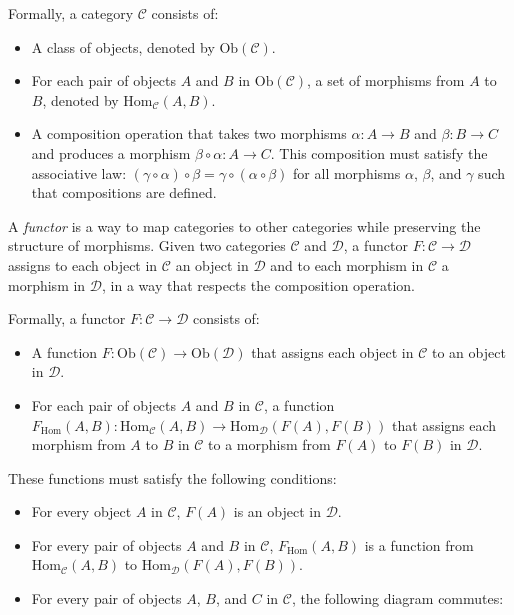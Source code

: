 \documentclass[11pt, a4paper, twoside, openany]{book}
\begin{document}
{\par\medskip
Formally, a category $\mathcal{C}$ consists of:
\begin{itemize}
\item A class of objects, denoted by $\text{Ob}(\mathcal{C})$.
\item For each pair of objects $A$ and $B$ in $\text{Ob}(\mathcal{C})$, a set of morphisms from $A$ to $B$, denoted by $\text{Hom}_{\mathcal{C}}(A, B)$. 
\item A composition operation that takes two morphisms $\alpha: A \rightarrow B$ and $\beta: B \rightarrow C$ and produces a morphism $\beta \circ \alpha: A \rightarrow C$. This composition must satisfy the associative law: $(\gamma \circ \alpha) \circ \beta = \gamma \circ (\alpha \circ \beta)$ for all morphisms $\alpha$, $\beta$, and $\gamma$ such that compositions are defined.
\end{itemize}

\par\medskip
A \textit{functor} is a way to map categories to other categories while preserving the structure of morphisms. Given two categories $\mathcal{C}$ and $\mathcal{D}$, a functor $F: \mathcal{C} \rightarrow \mathcal{D}$ assigns to each object in $\mathcal{C}$ an object in $\mathcal{D}$ and to each morphism in $\mathcal{C}$ a morphism in $\mathcal{D}$, in a way that respects the composition operation.

\par\medskip
Formally, a functor $F: \mathcal{C} \rightarrow \mathcal{D}$ consists of:
\begin{itemize}
\item A function $F: \text{Ob}(\mathcal{C}) \rightarrow \text{Ob}(\mathcal{D})$ that assigns each object in $\mathcal{C}$ to an object in $\mathcal{D}$.
\item For each pair of objects $A$ and $B$ in $\mathcal{C}$, a function $F_{\text{Hom}}(A, B): \text{Hom}_{\mathcal{C}}(A, B) \rightarrow \text{Hom}_{\mathcal{D}}(F(A), F(B))$ that assigns each morphism from $A$ to $B$ in $\mathcal{C}$ to a morphism from $F(A)$ to $F(B)$ in $\mathcal{D}$.
\end{itemize}

\par\medskip
These functions must satisfy the following conditions:
\begin{itemize}
\item For every object $A$ in $\mathcal{C}$, $F(A)$ is an object in $\mathcal{D}$.
\item For every pair of objects $A$ and $B$ in $\mathcal{C}$, $F_{\text{Hom}}(A, B)$ is a function from $\text{Hom}_{\mathcal{C}}(A, B)$ to $\text{Hom}_{\mathcal{D}}(F(A), F(B))$.
\item For every pair of objects $A$, $B$, and $C$ in $\mathcal{C}$, the following diagram commutes:


\end{itemize}}
\end{document}
